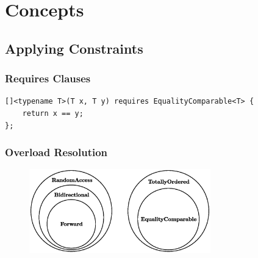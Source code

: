 \section{Concepts} \label{sec:concepts}

\newpage

\subsection{Applying Constraints} \label{sec:applying_constraints}

    \subsubsection{Requires Clauses} \label{sec:requires_clauses}

        

        \begin{lstlisting}
[]<typename T>(T x, T y) requires EqualityComparable<T> {
    return x == y;
}; \end{lstlisting}

        

        

        

        \newpage

    \subsubsection{Overload Resolution} \label{sec:overload_resolution}

        \begin{figure}[h]
            \centering
            \includegraphics[width=0.7\textwidth]{figures/overloading.eps}
        \end{figure}

        

